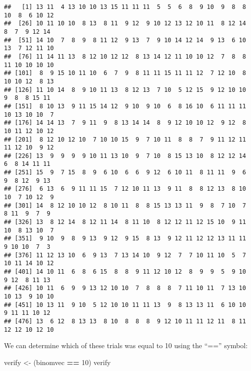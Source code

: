 \documentclass[
]{book}
\newenvironment{Shaded}{\begin{snugshade}}{\end{snugshade}}
\newcommand{\DecValTok}[1]{\textcolor[rgb]{0.00,0.00,0.81}{#1}}
\newcommand{\NormalTok}[1]{#1}
\newcommand{\OperatorTok}[1]{\textcolor[rgb]{0.81,0.36,0.00}{\textbf{#1}}}
\newcommand{\StringTok}[1]{\textcolor[rgb]{0.31,0.60,0.02}{#1}}
\begin{document}
\begin{verbatim}
##   [1] 13 11  4 13 10 10 13 15 11 11 11  5  5  6  8  9 10  9  8  8 10  8  6 10 12
##  [26] 10 11 10 10  8 13  8 11  9 12  9 10 12 13 12 10 11  8 12 14  8  7  9 12 14
##  [51] 14 10  7  8  9  8 11 12  9 13  7  9 10 14 12 14  9 13  6 10 13  7 12 11 10
##  [76] 11 14 11 13  8 12 10 12 12  8 13 14 12 11 10 10 12  7  8  8 11 10 10 10 10
## [101]  8  9 15 10 11 10  6  7  9  8 11 11 15 11 11 12  7 12 10  8 10 10 12  8 13
## [126] 11 10 14  8  9 10 11 13  8 12 13  7 10  5 12 15  9 12 10 10  9  8  8 15 11
## [151]  8 10 13  9 11 15 14 12  9 10  9 10  6  8 16 10  6 11 11 11 10 13 10 10  7
## [176] 14 14 13  7  9 11  9  8 13 14 14  8  9 12 10 10 12  9 12  8 10 11 12 10 12
## [201]  8 12 10 12 10  7 10 10 15  9  7 10 11  8  8  7  9 11 12 11 11 12 10  9 12
## [226] 13  9  9  9  9 10 11 13 10  9  7 10  8 15 13 10  8 12 12 14  6  8 14 11 11
## [251] 15  9  7 15  8  9  6 10  6  6  9 12  6 10 11  8 11 11  9  6  9  8 12  9 13
## [276]  6 13  6  9 11 11 15  7 12 10 11 13  9 11  8  8 12 13  8 10 10  7 10 12  9
## [301] 14  8 12 10 10 12  8 10 11  8  8 15 13 13 11  9  8  7 10  7  8 11  9  7  9
## [326] 13  8 12 14  8 12 11 14  8 11 10  8 12 12 11 12 15 10  9 11 10  8 13 10  7
## [351]  9 10  9  8  9 13  9 12  9 15  8 13  9 12 11 12 12 13 11 11  9 10 10  7  3
## [376] 11 12 13 10  6  9 13  7 13 14 10  9 12  7  7 10 11 10  5  7 10 11 14 10 12
## [401] 14 10 11  6  8  6 15  8  8  9 11 12 10 12  8  9  9  5  9 10  9 12  8 11 13
## [426] 10 11  6  9  9 13 12 10 10  7  8  8  8  7 11 10 11  7 13 10 10 13  9 10 10
## [451] 10 13 11  9 10  5 12 10 10 11 11 13  9  8 13 13 11  6 10 10  9 11 11 10 12
## [476] 13  6 12  8 13 13  8 10  8  8  8  9 12 10 11 11 12 11  8 11 12 12 10 12 10
\end{verbatim}

We can determine which of these trials was equal to 10 using the ``=='' symbol:

\begin{Shaded}
\begin{Highlighting}[]
\NormalTok{verify \textless{}{-}}\StringTok{ }\NormalTok{(binomvec }\OperatorTok{==}\StringTok{ }\DecValTok{10}\NormalTok{)}
\NormalTok{verify}
\end{Highlighting}
\end{Shaded}
\end{document}
